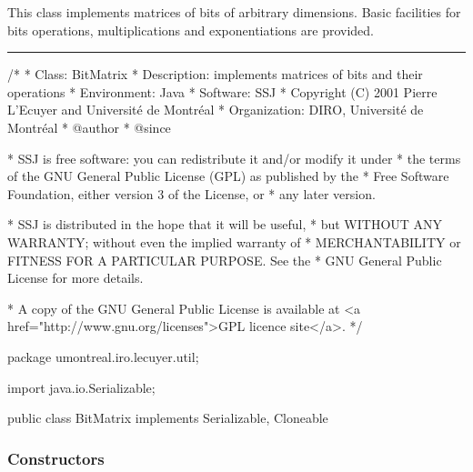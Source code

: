 
This class implements matrices of bits of arbitrary dimensions. Basic
facilities for bits operations, multiplications and exponentiations are
provided.

\bigskip\hrule
\begin{code}
\begin{hide}
/*
 * Class:        BitMatrix
 * Description:  implements matrices of bits and their operations
 * Environment:  Java
 * Software:     SSJ 
 * Copyright (C) 2001  Pierre L'Ecuyer and Université de Montréal
 * Organization: DIRO, Université de Montréal
 * @author       
 * @since

 * SSJ is free software: you can redistribute it and/or modify it under
 * the terms of the GNU General Public License (GPL) as published by the
 * Free Software Foundation, either version 3 of the License, or
 * any later version.

 * SSJ is distributed in the hope that it will be useful,
 * but WITHOUT ANY WARRANTY; without even the implied warranty of
 * MERCHANTABILITY or FITNESS FOR A PARTICULAR PURPOSE.  See the
 * GNU General Public License for more details.

 * A copy of the GNU General Public License is available at
   <a href="http://www.gnu.org/licenses">GPL licence site</a>.
 */
\end{hide}
package umontreal.iro.lecuyer.util; \begin{hide}

import java.io.Serializable;
\end{hide}


public class BitMatrix implements Serializable, Cloneable \begin{hide} {

   static final long serialVersionUID = 2472769969919959608L;

   private BitVector[] rows;        //rows vectors

   private int r, c;                //number of rows / columns

 \end{hide}
\end{code}

\subsubsection* {Constructors}

